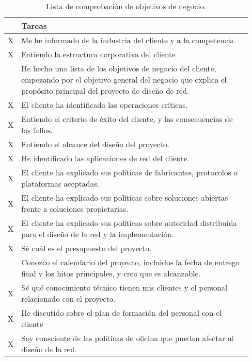 \begin{table}[H]
	\begin{center}
		\begin{tabular}{|c|l|}
			\hline 
			 & Tareas  \\ 
			\hline \hline
			 X & Me he informado de la industria del cliente y a la competencia.  \\ \hline
			 X & Entiendo la estructura corporativa del cliente  \\ \hline
			 & He hecho una lista de los objetivos de negocio del cliente, empezando por el objetivo general del negocio que explica el propósito principal del proyecto de diseño de red.  \\ \hline
			 X & El cliente ha identificado las operaciones críticas. \\ \hline
			 X & Entiendo el criterio de éxito del cliente, y las consecuencias de los
			 fallos.  \\ \hline
			 X & Entiendo el alcance del diseño del proyecto.  \\ \hline
			 X & He identificado las aplicaciones de red del cliente.  \\ \hline
			 X & El cliente ha explicado sus políticas de fabricantes, protocolos o
			 plataformas aceptadas.  \\ \hline
			 X & El cliente ha explicado sus políticas sobre soluciones abiertas frente a
			 soluciones propietarias.  \\ \hline
			 X & El cliente ha explicado sus políticas sobre autoridad distribuida para el
			 diseño de la red y la implementación.  \\ \hline
			 X & Sé cuál es el presupuesto del proyecto.  \\ \hline
			 & Conozco el calendario del proyecto, incluidos la fecha de entrega final
			 y los hitos principales, y creo que es alcanzable.  \\ \hline
			 X & Sé qué conocimiento técnico tienen mis clientes y el personal
			 relacionado con el proyecto.  \\ \hline
			 X & He discutido sobre el plan de formación del personal con el cliente  \\ \hline
			 X & Soy consciente de las políticas de oficina que puedan afectar al diseño
			 de la red.  \\ \hline
		\end{tabular}
		\caption{Lista de comprobación de objetivos de negocio.}
		\label{tabla:tabla1}
	\end{center}
\end{table}

